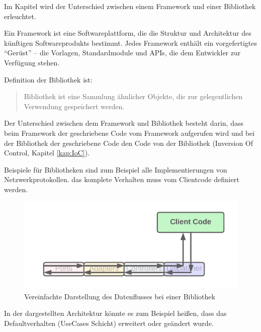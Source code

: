 Im Kapitel wird der Unterschied zwischen einem Framework und einer Bibliothek erleuchtet.

Ein Framework ist eine Softwareplattform, die die Struktur und Architektur des künftigen Softwareprodukts bestimmt.
Jedes Framework enthält ein vorgefertigtes “Gerüst” – die Vorlagen, Standardmodule und APIs, 
die dem Entwickler zur Verfügung stehen.
\footnotemark
{}

Definition der Bibliothek ist:
\begin{quote}
    Bibliothek ist eine Sammlung ähnlicher Objekte, die zur gelegentlichen Verwendung gespeichert werden.\footnotemark
\end{quote}

Der Unterschied zwischen dem Framework und Bibliothek besteht darin, 
dass beim Framework der geschriebene Code vom Framework aufgerufen wird 
und bei der Bibliothek der geschriebene Code den Code von der Bibliothek  (Inversion Of Control, Kapitel \ref{kap:IoC}).
\footnotemark
{}

Beispiele für Bibliotheken sind zum Beispiel alle Implementierungen von Netzwerkprotokollen.
das komplete Verhalten muss vom Clientcode definiert werden.

\begin{figure}[H]
    \centering
    \includegraphics[width=1\textwidth]{./images/Dataflow Library.png}
    \caption{Vereinfachte Darstellung des Datenflusses bei einer Bibliothek}
    \label{fig:SimpliedDataflowLibrary}
\end{figure}

In der dargestellten Architektur könnte es zum Beispiel heißen, 
dass das Defaultverhalten (UseCases Schicht) erweitert oder geändert wurde.

